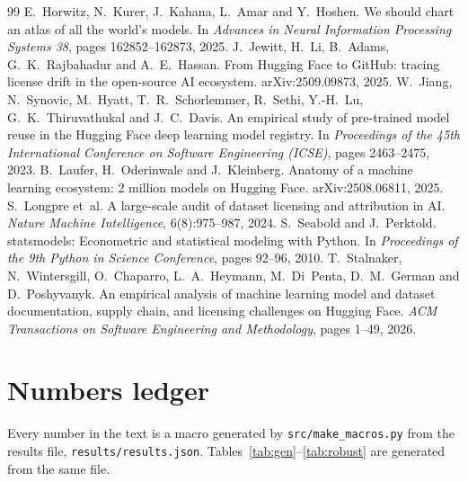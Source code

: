 \documentclass[11pt]{article}
\begin{document}
\begin{thebibliography}{99}
 E.~Horwitz, N.~Kurer, J.~Kahana, L.~Amar and Y.~Hoshen. We should chart an atlas of all the world's models. In \emph{Advances in Neural Information Processing Systems 38}, pages 162852--162873, 2025.
 J.~Jewitt, H.~Li, B.~Adams, G.~K.~Rajbahadur and A.~E.~Hassan. From Hugging Face to GitHub: tracing license drift in the open-source AI ecosystem. arXiv:2509.09873, 2025.
 W.~Jiang, N.~Synovic, M.~Hyatt, T.~R.~Schorlemmer, R.~Sethi, Y.-H.~Lu, G.~K.~Thiruvathukal and J.~C.~Davis. An empirical study of pre-trained model reuse in the Hugging Face deep learning model registry. In \emph{Proceedings of the 45th International Conference on Software Engineering (ICSE)}, pages 2463--2475, 2023.
 B.~Laufer, H.~Oderinwale and J.~Kleinberg. Anatomy of a machine learning ecosystem: 2 million models on Hugging Face. arXiv:2508.06811, 2025.
 S.~Longpre et~al. A large-scale audit of dataset licensing and attribution in AI. \emph{Nature Machine Intelligence}, 6(8):975--987, 2024.
 S.~Seabold and J.~Perktold. statsmodels: Econometric and statistical modeling with Python. In \emph{Proceedings of the 9th Python in Science Conference}, pages 92--96, 2010.
 T.~Stalnaker, N.~Wintersgill, O.~Chaparro, L.~A.~Heymann, M.~Di~Penta, D.~M.~German and D.~Poshyvanyk. An empirical analysis of machine learning model and dataset documentation, supply chain, and licensing challenges on Hugging Face. \emph{ACM Transactions on Software Engineering and Methodology}, pages 1--49, 2026.
\end{thebibliography}

\normalsize
\clearpage
\appendix
\section{Numbers ledger}
Every number in the text is a macro generated by \texttt{src/make\_macros.py} from the results file, \texttt{results/results.json}. Tables~\ref{tab:gen}--\ref{tab:robust} are generated from the same file.
{\footnotesize}
\end{document}
